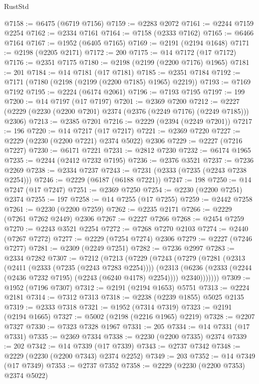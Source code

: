 \begin{lexlean}{RustStd}
\begin{coremodule}
{\begin{coremodule}
{{{{{{{{{{{{{{{{{{{{{{{{{{{{{{{{{{@7158 := @6475 (@6719 @7156)
@7159 := @2283 @2072
@7161 := @2244 @7159 @2254
@7162 := @2334 @7161
@7164 := @7158 (@2333 @7162)
@7165 := @6466 @7164
@7167 := @1952 (@6405 @7165)
@7169 := @2191 (@2194 @1648)
@7171 := @2198 (@2205 @2171)
@7172 := 200
@7175 := @14 @7172 (@17 @7172)
@7176 := @2351 @7175
@7180 := @2198 (@2199 (@2200 @7176) @1965)
@7181 := 201
@7184 := @14 @7181 (@17 @7181)
@7185 := @2351 @7184
@7192 := @7171 (@7180 (@2198 (@2199 (@2200 @7185) @1965) @2219))
@7193 := @7169 @7192
@7195 := @2224 (@6174 @2061)
@7196 := @7193 @7195
@7197 := 199
@7200 := @14 @7197 (@17 @7197)
@7201 := @2369 @7200
@7212 := @2227 (@2229 (@2230 (@2200 @7201) @2374 (@2376 (@2249 @7176) (@2249 @7185))) @2306)
@7213 := @2385 @7201
@7216 := @2229 (@2394 (@2249 @7201))
@7217 := 196
@7220 := @14 @7217 (@17 @7217)
@7221 := @2369 @7220
@7227 := @2229 (@2230 (@2200 @7221) @2374 @5022) @2306
@7229 := @2227 (@7216 @7227)
@7230 := @6171 @7221
@7231 := @2812 @7230
@7232 := @6174 @1965
@7235 := @2244 (@2412 @7232 @7195)
@7236 := @2376 @3521
@7237 := @7236 @2269
@7238 := @2334 @7237
@7243 := @7231 (@2333 (@7235 (@2243 @7238 @2254)))
@7246 := @2229 (@6187 (@6188 @7221))
@7247 := 198
@7250 := @14 @7247 (@17 @7247)
@7251 := @2369 @7250
@7254 := @2230 (@2200 @7251) @2374
@7255 := 197
@7258 := @14 @7255 (@17 @7255)
@7259 := @2442 @7258
@7261 := @2230 (@2200 @7259)
@7262 := @2235 @2171
@7266 := @2229 (@7261 @7262 @2449) @2306
@7267 := @2227 @7266
@7268 := @2454 @7259
@7270 := @2243 @3521 @2254
@7272 := @7268 @7270 @2103
@7274 := @2440 (@7267 @7272)
@7277 := @2229 (@7254 @7274) @2306
@7279 := @2227 (@7246 @7277)
@7281 := @2309 (@2249 @7251)
@7282 := @7236 @2997
@7283 := @2334 @7282
@7307 := @7212
    (@7213
      (@7229
        (@7243
          (@7279
            (@7281
              (@2313
                (@2411 (@2333 (@7235 (@2243 @7283 @2254))))
                (@2313
                  (@6236 (@2333 (@2244 (@2436 @7232 @7195) (@2243 (@6240 @4178) @2254))))
                  @2340)))))))
@7309 := @1952 (@7196 @7307)
@7312 := @2191 (@2194 @1653) @5751
@7313 := @2224 @2181
@7314 := @7312 @7313
@7318 := @2238 (@2239 @1855) @5025 @2135
@7319 := @2333 @7318
@7321 := @1952 (@7314 @7319)
@7323 := @2191 (@2194 @1665)
@7327 := @5002 (@2198 (@2216 @1965) @2219)
@7328 := @2207 @7327
@7330 := @7323 @7328 @1967
@7331 := 205
@7334 := @14 @7331 (@17 @7331)
@7335 := @2369 @7334
@7338 := @2230 (@2200 @7335) @2374
@7339 := 202
@7342 := @14 @7339 (@17 @7339)
@7343 := @2737 @7342
@7348 := @2229 (@2230 (@2200 @7343) @2374 @2252)
@7349 := 203
@7352 := @14 @7349 (@17 @7349)
@7353 := @2737 @7352
@7358 := @2229 (@2230 (@2200 @7353) @2374 @5022)
}}}}}}}}}}}}}}}}}}}}}}}}}}}}}}}}}}
\end{coremodule}}
\end{coremodule}
\end{lexlean}
